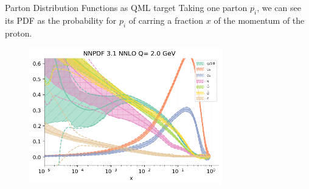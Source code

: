 \documentclass[8pt, xcolor={svgnames}, hyperref={linkcolor=black}]{beamer}
\begin{document}
\begin{frame}{Parton Distribution Functions as QML target}
Taking one parton $p_i$, we can see its PDF as the probability for $p_i$ of carring 
a fraction $x$ of the momentum of the proton.
\begin{figure}  
   \includegraphics[width=0.75\textwidth]{figures/pdf.png}
\end{figure}
\end{frame}
\end{document}
